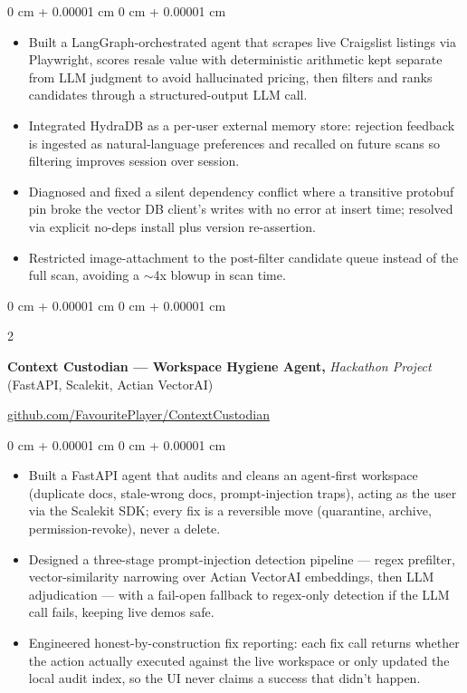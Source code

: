 \documentclass[10pt, letterpaper]{article}
\newenvironment{highlights}{
    \begin{itemize}[
        topsep=0.3 cm,
        parsep=0.05 cm,
        partopsep=0pt,
        itemsep=0pt,
        leftmargin=0 cm + 10pt
    ]
}{
    \end{itemize}
} %
\newenvironment{onecolentry}{
    \begin{adjustwidth}{
        0 cm + 0.00001 cm
    }{
        0 cm + 0.00001 cm
    }
}{
    \end{adjustwidth}
} %
\newenvironment{extendedtwocolentry}[2][]{
    \onecolentry
    \def\secondColumn{#2}
    \setcolumnwidth{\fill, 8 cm}
    \begin{paracol}{2}
}{
    \switchcolumn \raggedleft \secondColumn
    \end{paracol}
    \endonecolentry
}
\begin{document}
        \vspace{0.07 cm}
        \begin{onecolentry}
            \begin{highlights}
                \item Built a LangGraph-orchestrated agent that scrapes live Craigslist listings via Playwright, scores resale value with deterministic arithmetic kept separate from LLM judgment to avoid hallucinated pricing, then filters and ranks candidates through a structured-output LLM call.
                \item Integrated HydraDB as a per-user external memory store: rejection feedback is ingested as natural-language preferences and recalled on future scans so filtering improves session over session.
                \item Diagnosed and fixed a silent dependency conflict where a transitive protobuf pin broke the vector DB client's writes with no error at insert time; resolved via explicit no-deps install plus version re-assertion.
                \item Restricted image-attachment to the post-filter candidate queue instead of the full scan, avoiding a $\sim$4x blowup in scan time.
            \end{highlights}
        \end{onecolentry}

        \begin{extendedtwocolentry}{
            \href{https://github.com/FavouritePlayer/ContextCustodian}{github.com/FavouritePlayer/ContextCustodian}
        }
            \textbf{Context Custodian — Workspace Hygiene Agent,} \textit{Hackathon Project} (FastAPI, Scalekit, Actian VectorAI)
        \end{extendedtwocolentry}

        \vspace{0.07 cm}
        \begin{onecolentry}
            \begin{highlights}
                \item Built a FastAPI agent that audits and cleans an agent-first workspace (duplicate docs, stale-wrong docs, prompt-injection traps), acting as the user via the Scalekit SDK; every fix is a reversible move (quarantine, archive, permission-revoke), never a delete.
                \item Designed a three-stage prompt-injection detection pipeline — regex prefilter, vector-similarity narrowing over Actian VectorAI embeddings, then LLM adjudication — with a fail-open fallback to regex-only detection if the LLM call fails, keeping live demos safe.
                \item Engineered honest-by-construction fix reporting: each fix call returns whether the action actually executed against the live workspace or only updated the local audit index, so the UI never claims a success that didn't happen.
            \end{highlights}
        \end{onecolentry}
\end{document}
